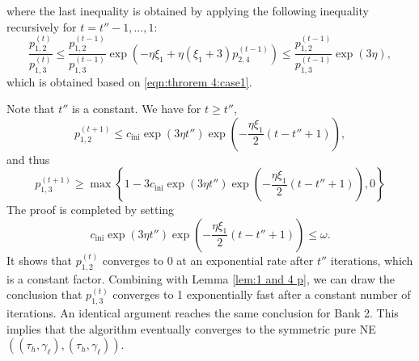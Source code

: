 where the last inequality is obtained by applying the following inequality recursively for $t=t''-1,\dots,1$:
$$  \frac{p^{(t)}_{1,2}}{p^{(t)}_{1,3}}  \leq  \frac{p^{(t-1)}_{1,2}}{p^{(t-1)}_{1,3}}\exp\left( -\eta\xi_1 + \eta(\xi_1+3) p^{(t-1)}_{2,4}  \right)\leq \frac{p^{(t-1)}_{1,2}}{p^{(t-1)}_{1,3}} \exp(3\eta),$$
which is obtained based on \eqref{eqn:throrem 4:case1}.

Note that $t''$ is a constant. We have for $t\geq t''$,
$$p^{(t+1)}_{1,2}\leq c_{\text{ini}}\exp\left(3\eta t''\right)\exp\left(-\frac{\eta\xi_1}{2}\left(t-t''+1\right)\right), $$ 
and thus 
$$ p^{(t+1)}_{1,3}\geq \max\left\{ 1 -3c_{\text{ini}}\exp\left(3\eta t''\right)\exp\left(-\frac{\eta\xi_1}{2}\left(t-t''+1\right)\right),0\right\} $$
The proof is completed by setting 
$$c_{\text{ini}}\exp\left(3\eta t''\right)\exp\left(-\frac{\eta\xi_1}{2}\left(t-t''+1\right)\right)\leq \omega.$$
It shows that $p_{1,2}^{(t)}$ converges to 0 at an exponential rate after $t''$ iterations, which is a constant factor. Combining with Lemma \ref{lem:1 and 4 p}, we can draw the conclusion that $p_{1,3}^{(t)}$ converges to 1 exponentially fast after a constant number of iterations.
An identical argument reaches the same conclusion for Bank 2.
This implies that the algorithm eventually converges to the symmetric pure NE $((\tau_h, \gamma_{\ell}),(\tau_h, \gamma_{\ell}))$.
\\



